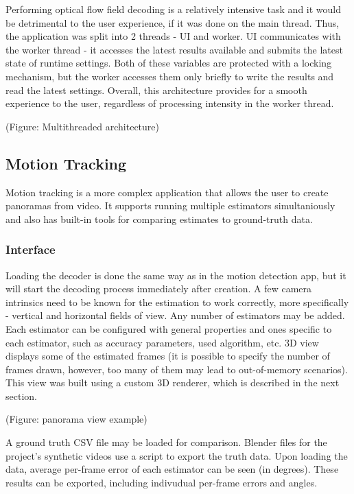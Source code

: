 \documentclass[11pt,english]{report}
\begin{document}
Performing optical flow field decoding is a relatively intensive task and it would be detrimental to the user experience, if it was done on the main thread. Thus, the application was split into 2 threads - UI and worker. UI communicates with the worker thread - it accesses the latest results available and submits the latest state of runtime settings. Both of these variables are protected with a locking mechanism, but the worker accesses them only briefly to write the results and read the latest settings. Overall, this architecture provides for a smooth experience to the user, regardless of processing intensity in the worker thread.

(Figure: Multithreaded architecture)

\subsection{Motion Tracking}

Motion tracking is a more complex application that allows the user to create panoramas from video. It supports running multiple estimators simultaniously and also has built-in tools for comparing estimates to ground-truth data.

\subsubsection{Interface}

Loading the decoder is done the same way as in the motion detection app, but it will start the decoding process immediately after creation. A few camera intrinsics need to be known for the estimation to work correctly, more specifically - vertical and horizontal fields of view. Any number of estimators may be added. Each estimator can be configured with general properties and ones specific to each estimator, such as accuracy parameters, used algorithm, etc. 3D view displays some of the estimated frames (it is possible to specify the number of frames drawn, however, too many of them may lead to out-of-memory scenarios). This view was built using a custom 3D renderer, which is described in the next section.

(Figure: panorama view example)

A ground truth CSV file may be loaded for comparison. Blender files for the project's synthetic videos use a script to export the truth data. Upon loading the data, average per-frame error of each estimator can be seen (in degrees). These results can be exported, including indivudual per-frame errors and angles.
\end{document}
